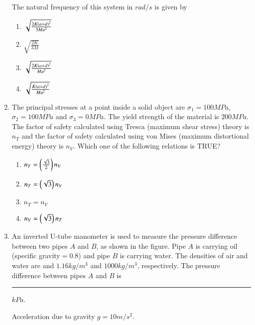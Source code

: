 \documentclass[journal]{IEEEtran}
\begin{document}
\begin{enumerate}
The natural frequency of this system in $rad/s$ is given by
\begin{multicols}{2}
\begin{enumerate}
\item $\sqrt{\frac{2K\left(a+d\right)^{2}}{3Ma^{2}}}$
\item $\sqrt{\frac{2K}{3M}}$
\item $\sqrt{\frac{2K\left(a+d\right)^{2}}{Ma^{2}}}$
\item $\sqrt{\frac{K\left(a+d\right)^{2}}{Ma^{2}}}$
\end{enumerate}
\end{multicols}


\item The principal stresses at a point inside a solid object are $\sigma_{1}=100MPa$, $\sigma_{2}=100 MPa$ and $\sigma_{3}=0MPa$. The yield strength of the material is $200MPa$. The factor of safety calculated using Tresca (maximum shear stress) theory is $n_{T}$ and the factor of safety calculated using von Mises (maximum distortional energy) theory is $n_{V}$. Which one of the following relations is TRUE?
\begin{multicols}{2}
\begin{enumerate}
\item $n_{T}=\left(\frac{\sqrt{3}}{2}\right)n_{V}$
\item $n_{T}=\left(\sqrt{3}\right)n_{V}$
\item $n_{T}=n_{V}$
\item $n_{V}=\left(\sqrt{3}\right)n_{T}$
\end{enumerate}
\end{multicols}


\item An inverted U-tube manometer is used to measure the pressure difference between two pipes $A$ and $B$, as shown in the figure. Pipe $A$ is carrying oil (specific gravity$=0.8$) and pipe $B$ is carrying water. The densities of air and water are and $1.16kg/m^{3}$ and $1000kg/m^{3}$, respectively. The pressure difference between pipes $A$ and $B$ is \rule{1cm}{0.15mm} $kPa$.

Acceleration due to gravity $g=10m/s^{2}$.


\end{enumerate}
\end{document}
